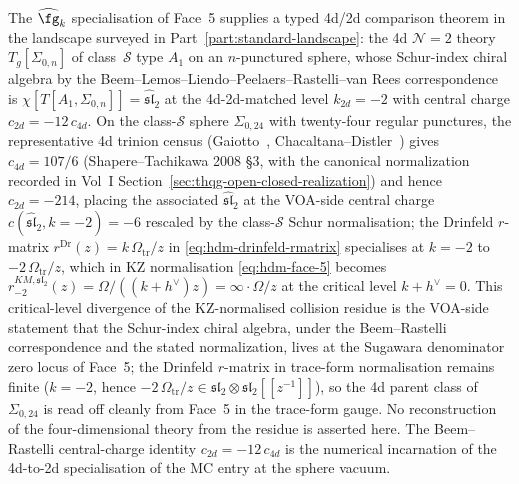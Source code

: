 \begin{remark}
\label{rem:holo-master-class-S}
The $\widehat{\fg}_k$ specialisation of Face~5 supplies a typed
4d/2d comparison theorem in the landscape surveyed in
Part~\ref{part:standard-landscape}: the 4d $\mathcal N = 2$ theory
$T_g[\Sigma_{0,n}]$ of class~$\mathcal S$ type $A_1$ on an $n$-punctured
sphere, whose Schur-index chiral algebra by the
Beem--Lemos--Liendo--Peelaers--Rastelli--van Rees
correspondence~\cite{BLLPRvR15} is
$\chi[T[A_1,\Sigma_{0,n}]] = \widehat{\mathfrak{sl}}_2$ at the
4d-2d-matched level $k_{2d} = -2$ with central charge
$c_{2d} = -12\,c_{4d}$. On the class-$\mathcal S$ sphere
$\Sigma_{0,24}$ with twenty-four regular punctures, the
representative 4d trinion census
(Gaiotto~\cite{Gaiotto12}, Chacaltana--Distler~\cite{ChacaltanaDistler10})
gives $c_{4d} = 107/6$ (Shapere--Tachikawa 2008 \S 3, with the
canonical normalization recorded in Vol~I
Section~\ref{sec:thqg-open-closed-realization}) and
hence $c_{2d} = -214$, placing the
associated $\widehat{\mathfrak{sl}}_2$ at the VOA-side central charge
$c(\widehat{\mathfrak{sl}}_2, k = -2) = -6$ rescaled by the
class-$\mathcal S$ Schur normalisation; the Drinfeld $r$-matrix
$r^{\mathrm{Dr}}(z) = k\,\Omega_{\mathrm{tr}}/z$ in
\eqref{eq:hdm-drinfeld-rmatrix} specialises at $k = -2$ to
$-2\,\Omega_{\mathrm{tr}}/z$, which in KZ normalisation
\eqref{eq:hdm-face-5} becomes
$r^{KM,\mathfrak{sl}_2}_{-2}(z) = \Omega / ((k+h^\vee) z) =
\infty \cdot \Omega / z$ at the critical level $k + h^\vee = 0$.
This critical-level divergence of the KZ-normalised collision residue
is the VOA-side statement that the Schur-index chiral algebra, under
the Beem--Rastelli correspondence and the stated normalization, lives
at the Sugawara denominator zero locus of
Face~5; the Drinfeld $r$-matrix in trace-form normalisation remains
finite ($k = -2$, hence
$-2\,\Omega_{\mathrm{tr}}/z \in \mathfrak{sl}_2 \otimes \mathfrak{sl}_2
[\![z^{-1}]\!]$), so the 4d parent class of
$\Sigma_{0,24}$ is read off cleanly from Face~5 in the trace-form
gauge. No reconstruction of the four-dimensional theory from the
residue is asserted here. The Beem--Rastelli central-charge identity
$c_{2d} = -12\,c_{4d}$ is the numerical incarnation of the
4d-to-2d specialisation of the MC entry at the sphere vacuum.
\end{remark}

